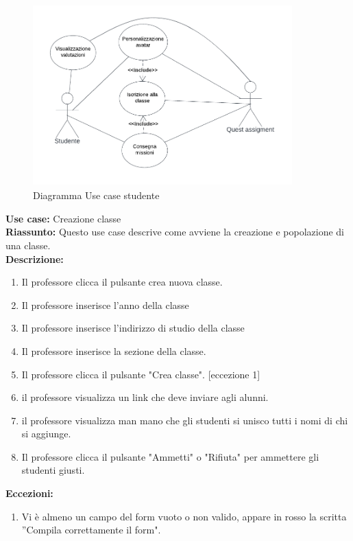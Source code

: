 \begin{figure}[h!]
  \centerline{\includegraphics[trim={0 0.9cm 0 0.6cm},clip,height=7cm,width=10cm,angle=0]{figures/studente.pdf}}
  \caption{Diagramma Use case studente}
\end{figure}









\textbf{Use case:} Creazione classe\\
\textbf{Riassunto:} Questo use case descrive come avviene la creazione e popolazione di una classe.\\
\textbf{Descrizione:} \begin{enumerate}
  \item Il professore clicca il pulsante crea nuova classe.

  \item Il professore inserisce l'anno della classe

  \item Il professore inserisce l'indirizzo di studio della classe

  \item Il professore inserisce la sezione della classe.

  \item Il professore clicca il pulsante "Crea classe". [eccezione 1]

  \item il professore visualizza un link che deve inviare agli alunni.

  \item il professore visualizza man mano che gli studenti si unisco tutti i nomi di chi si aggiunge.

  \item Il professore clicca il pulsante "Ammetti" o "Rifiuta" per ammettere gli studenti giusti.
\end{enumerate}
\textbf{Eccezioni: }\begin{enumerate}
  \item Vi è almeno un campo del form vuoto o non valido, appare in rosso la
  scritta ”Compila correttamente il form".
\end{enumerate}














